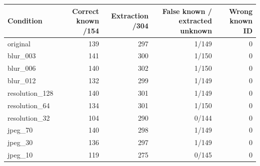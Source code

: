 \begin{tabular}{lrrrr}
\hline
Condition & Correct known /154 & Extraction /304 & False known / extracted unknown & Wrong known ID \\
\hline
original & 139 & 297 & 1/149 & 0 \\
blur\_003 & 141 & 300 & 1/150 & 0 \\
blur\_006 & 140 & 302 & 1/150 & 0 \\
blur\_012 & 132 & 299 & 1/149 & 0 \\
resolution\_128 & 140 & 301 & 1/149 & 0 \\
resolution\_64 & 134 & 301 & 1/150 & 0 \\
resolution\_32 & 104 & 290 & 0/144 & 0 \\
jpeg\_70 & 140 & 298 & 1/149 & 0 \\
jpeg\_30 & 136 & 297 & 1/149 & 0 \\
jpeg\_10 & 119 & 275 & 0/145 & 0 \\
\hline
\end{tabular}
